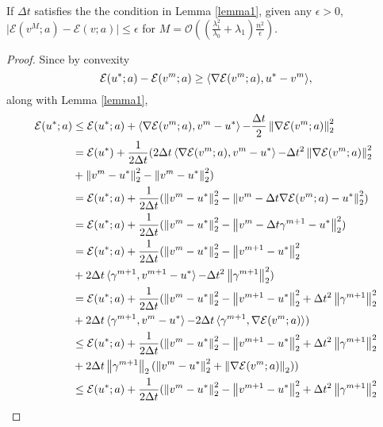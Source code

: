\begin{thm}
	\label{theorem:one}
	If $\Delta t$ satisfies the the condition in Lemma \ref{lemma1}, given any $\epsilon > 0$, $\vert \mathcal{E}(v^M;a) - \mathcal{E}(v;a)\vert \leq \epsilon$ for $M = \mathcal{O}((\frac{\lambda_{1}^2}{\lambda_{0}} + \lambda_{1}) \frac{n^2}{\epsilon})$.
	
	\begin{proof}
		Since by convexity 
		\begin{equation}
		\mathcal{E}(u^*;a) - \mathcal{E}(v^m;a) \geq \mathop{\langle \nabla \mathcal{E}(v^m;a), u^* - v^m \rangle},
		\end{equation}
		along with Lemma \ref{lemma1},
		\begin{align*}
		\mathcal{E}(u^*;a) &\leq \mathcal{E}(u^*;a) + \innerProduct{\nabla \mathcal{E}(v^m;a)}{v^m - u^*} - \frac{\Delta t }{2} \norm{\nabla \mathcal{E}(v^m;a)}_{2}^{2}\\
		&= \mathcal{E}(u^*) + \frac{1}{2\Delta t} (2\Delta t \innerProduct{\nabla \mathcal{E}(v^m;a)}{ v^m - u^*} - \Delta t^2 \norm{\nabla \mathcal{E}(v^m;a)}_{2}^{2} \\
		&+ \norm{v^m - u^*}_{2}^{2} - \norm{v^m - u^*}_{2}^{2})\\
		&= \mathcal{E}(u^*;a) + \frac{1}{2 \Delta t}(\norm{v^m-u^*}_{2}^{2} - \norm{v^m - \Delta t \nabla \mathcal{E}(v^m;a) - u^*}_{2}^{2})\\
		&= \mathcal{E}(u^*;a) + \frac{1}{2 \Delta t}(\norm{v^m-u^*}_{2}^{2} - \norm{v^m - \Delta t \gamma^{m+1} - u^*}_{2}^{2})\\
		&= \mathcal{E}(u^*;a) + \frac{1}{2 \Delta t}(\norm{v^m-u^*}_{2}^{2} - \norm{v^{m+1} - u^*}_{2}^{2}\\
		&+ 2\Delta t \innerProduct{\gamma^{m+1}}{v^{m+1}-u^*} - \Delta t^2 \norm{\gamma^{m+1}}_{2}^{2})\\
		&= \mathcal{E}(u^*;a) + \frac{1}{2 \Delta t}(\norm{v^m-u^*}_{2}^{2} - \norm{v^{m+1} - u^*}_{2}^{2} + \Delta t^2 \norm{\gamma^{m+1}}_{2}^{2}\\
		&+ 2\Delta t \innerProduct{\gamma^{m+1}}{v^{m}-u^*} - 2\Delta t \innerProduct{\gamma^{m+1}}{\nabla \mathcal{E}(v^m;a)})\\
		&\leq \mathcal{E}(u^*;a) + \frac{1}{2 \Delta t}(\norm{v^m-u^*}_{2}^{2} - \norm{v^{m+1} - u^*}_{2}^{2} + \Delta t^2 \norm{\gamma^{m+1}}_{2}^{2}\\
		&+ 2\Delta t \norm{\gamma^{m+1}}_{2} (\norm{v^m - u^*}_{2}^{2} + \norm{\nabla \mathcal{E}(v^m;a)}_{2}))\\
		&\leq \mathcal{E}(u^*;a) + \frac{1}{2 \Delta t}(\norm{v^m-u^*}_{2}^{2} - \norm{v^{m+1} - u^*}_{2}^{2} + \Delta t^2 \norm{\gamma^{m+1}}_{2}^{2}\\

\end{align*}
\end{proof}
\end{thm}

